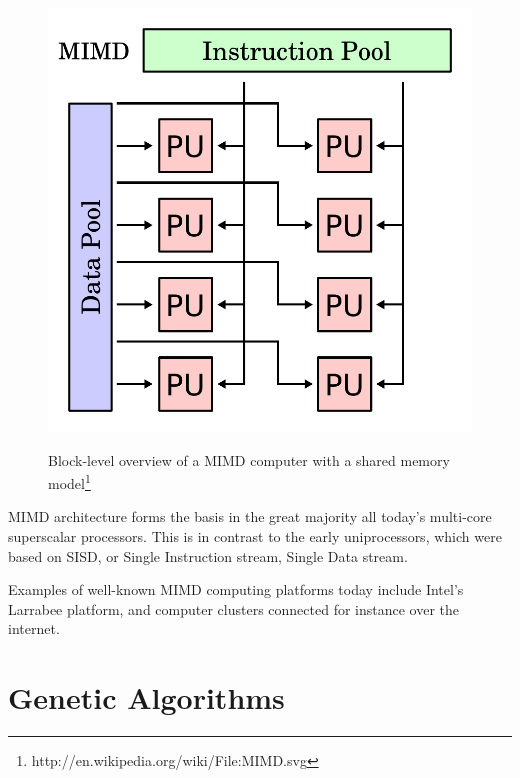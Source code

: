 \begin{figure}[H]
\begin{center}
    \includegraphics[width=\textwidth/2]{fig/mimd-block-diagram.pdf}
    \label{figure:mimd-block-diagram}
    \caption[
    Block-level overview of a MIMD computer with a shared memory model
    ]{
    Block-level overview of a MIMD computer with a shared memory model\footnote{http://en.wikipedia.org/wiki/File:MIMD.svg}}
\end{center}
\end{figure}

MIMD architecture forms the basis in the great majority all today’s multi-core superscalar processors.
This is in contrast to the early uniprocessors, which were based on SISD, or Single Instruction stream, Single Data stream. 


Examples of well-known MIMD computing platforms today include Intel's Larrabee platform, and computer clusters connected for instance over the internet.

\section{Genetic Algorithms}

